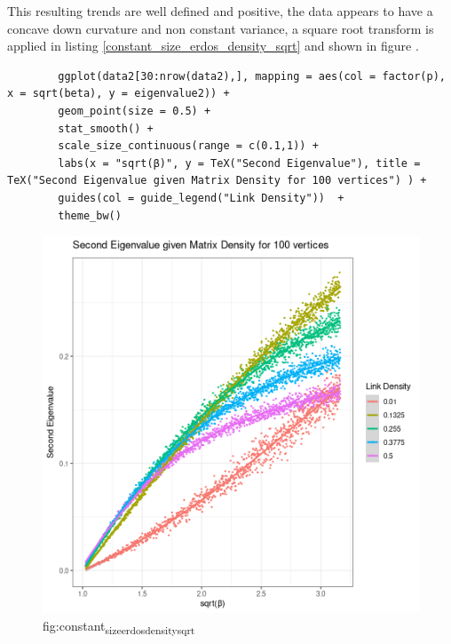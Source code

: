 \documentclass[11pt]{report}
\begin{document}
This resulting trends are well defined and positive, the data appears to have a
concave down curvature and non constant variance, a square root transform is applied in
listing \ref{constant_size_erdos_density_sqrt} and shown in figure .


\begin{listing}[htbp]
    \begin{tcolorbox}
        \begin{verbatim}
        ggplot(data2[30:nrow(data2),], mapping = aes(col = factor(p), x = sqrt(beta), y = eigenvalue2)) +
        geom_point(size = 0.5) +
        stat_smooth() +
        scale_size_continuous(range = c(0.1,1)) +
        labs(x = "sqrt(β)", y = TeX("Second Eigenvalue"), title = TeX("Second Eigenvalue given Matrix Density for 100 vertices") ) +
        guides(col = guide_legend("Link Density"))  +
        theme_bw()
        \end{verbatim}
    \end{tcolorbox}
\caption{\label{constant_size_erdos_density_sqrt}listing:constant\textsubscript{size}\textsubscript{erdos}\textsubscript{density}\textsubscript{sqrt}}
\end{listing}


\begin{figure}[htbp]
\centering
\includegraphics[width=12cm]{media/constant_size_erdos_density_sqrt.png}
\caption{\label{fig:constant_size_erdos_density_sqrt}fig:constant\textsubscript{size}\textsubscript{erdos}\textsubscript{density}\textsubscript{sqrt}}
\end{figure}
\end{document}
